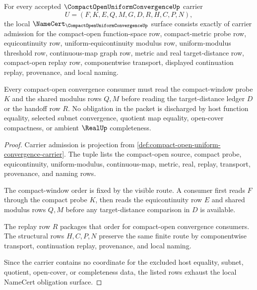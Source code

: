 \begin{theorem}
\label{thm:compact-open-uniform-convergence-namecert-obligations}
For every accepted $\CompactOpenUniformConvergenceUp$ carrier
$$
U=(F,K,E,Q,M,G,D,R,H,C,P,N),
$$
the local $\NameCert_{\CompactOpenUniformConvergenceUp}$ surface consists exactly of carrier admission for the compact-open function-space row, compact-metric probe row, equicontinuity row, uniform-equicontinuity modulus row, uniform-modulus threshold row, continuous-map graph row, metric and real target-distance row, compact-open replay row, componentwise transport, displayed continuation replay, provenance, and local naming.

Every compact-open convergence consumer must read the compact-window probe $K$ and the shared modulus rows $Q,M$ before reading the target-distance ledger $D$ or the handoff row $R$. No obligation in the packet is discharged by host function equality, selected subnet convergence, quotient map equality, open-cover compactness, or ambient $\RealUp$ completeness.
\end{theorem}
\begin{proof}
Carrier admission is projection from \autoref{def:compact-open-uniform-convergence-carrier}. The tuple lists the compact-open source, compact probe, equicontinuity, uniform-modulus, continuous-map, metric, real, replay, transport, provenance, and naming rows.

The compact-window order is fixed by the visible route. A consumer first reads $F$ through the compact probe $K$, then reads the equicontinuity row $E$ and shared modulus rows $Q,M$ before any target-distance comparison in $D$ is available.

The replay row $R$ packages that order for compact-open convergence consumers. The structural rows $H,C,P,N$ preserve the same finite route by componentwise transport, continuation replay, provenance, and local naming.

Since the carrier contains no coordinate for the excluded host equality, subnet, quotient, open-cover, or completeness data, the listed rows exhaust the local NameCert obligation surface.
\end{proof}

